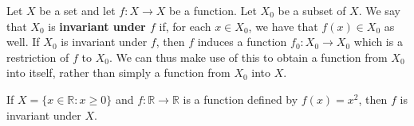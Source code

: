 \documentclass[12pt]{article}
\begin{document}
\begin{defn}
  Let $X$ be a set and let $f: X \to X$ be a function. Let $X_0$ be a subset of $X$.
  We say that $X_0$ is \textbf{invariant under $f$} if, for each $x \in X_0$, we have
  that $f(x) \in X_0$ as well. If $X_0$ is invariant under $f$, then $f$ induces a
  function $f_0: X_0 \to X_0$ which is a restriction of $f$ to $X_0$. We can thus
  make use of this to obtain a function from $X_0$ into itself, rather than simply a
  function from $X_0$ into $X$.
\end{defn}

\begin{exm}
  If $X = \{x \in \mathbb{R}: x \geq 0\}$ and $f: \mathbb{R} \to \mathbb{R}$ is a
  function defined by $f(x) = x^2$, then $f$ is invariant under $X$.
\end{exm}
\end{document}

